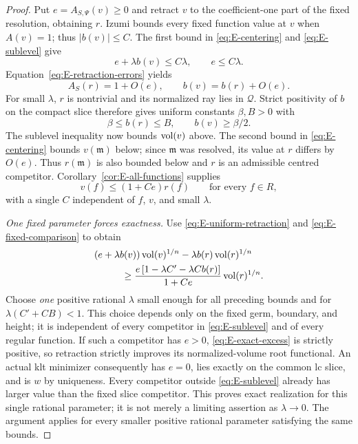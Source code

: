 \begin{proof}
Put $e=A_{S,\Psi}(v)\ge0$ and retract $v$ to the coefficient-one
part of the fixed resolution, obtaining $r$.
Izumi bounds every fixed function value at $v$ when $A(v)=1$;
thus $|b(v)|\le C$. The first bound in
\eqref{eq:E-centering} and \eqref{eq:E-sublevel} give
\[
 e+\lambda b(v)\le C\lambda,\qquad e\le C\lambda.
\]
Equation~\eqref{eq:E-retraction-errors} yields
\begin{equation}\label{eq:E-uniform-retraction}
 A_S(r)=1+O(e),\qquad b(v)=b(r)+O(e).
\end{equation}
For small $\lambda$, $r$ is nontrivial and its normalized ray lies in
$\mathcal Q$. Strict positivity of $b$ on the compact slice therefore
gives uniform constants $\beta,B>0$ with
\[
 \beta\le b(r)\le B,\qquad b(v)\ge\beta/2.
\]
The sublevel inequality now bounds $\operatorname{vol}(v)$ above. The second bound
in \eqref{eq:E-centering} bounds $v(\mathfrak m)$ below; since
$\mathfrak m$ was resolved, its value at $r$ differs by $O(e)$.
Thus $r(\mathfrak m)$ is also bounded below and $r$ is an admissible
centred competitor. Corollary~\ref{cor:E-all-functions} supplies
\begin{equation}\label{eq:E-fixed-comparison}
 v(f)\le(1+Ce)r(f)\qquad\text{for every }f\in R,
\end{equation}
with a single $C$ independent of $f$, $v$, and small $\lambda$.

\emph{One fixed parameter forces exactness.}
Use \eqref{eq:E-uniform-retraction} and
\eqref{eq:E-fixed-comparison} to obtain
\begin{align}
 &(e+\lambda b(v))\operatorname{vol}(v)^{1/n}
       -\lambda b(r)\operatorname{vol}(r)^{1/n}\notag\\
 &\hspace{1cm}\ge
 \frac{e\,[1-\lambda C'-\lambda Cb(r)]}{1+Ce}
                 \operatorname{vol}(r)^{1/n}.\label{eq:E-exact-excess}
\end{align}
Choose \emph{one} positive rational $\lambda$ small enough for all
preceding bounds and for $\lambda(C'+CB)<1$.
This choice depends only on the fixed germ, boundary, and height;
it is independent of every competitor in \eqref{eq:E-sublevel} and
of every regular function. If such a competitor has $e>0$,
\eqref{eq:E-exact-excess} is strictly positive, so retraction strictly
improves its normalized-volume root functional.
An actual klt minimizer consequently has $e=0$, lies exactly on the
common lc slice, and is $w$ by uniqueness. Every competitor outside
\eqref{eq:E-sublevel} already has larger value than the fixed slice
competitor. This proves exact realization for this single rational
parameter; it is not merely a limiting assertion as $\lambda\to0$.
The argument applies for every smaller positive rational parameter
satisfying the same bounds.


\end{proof}
